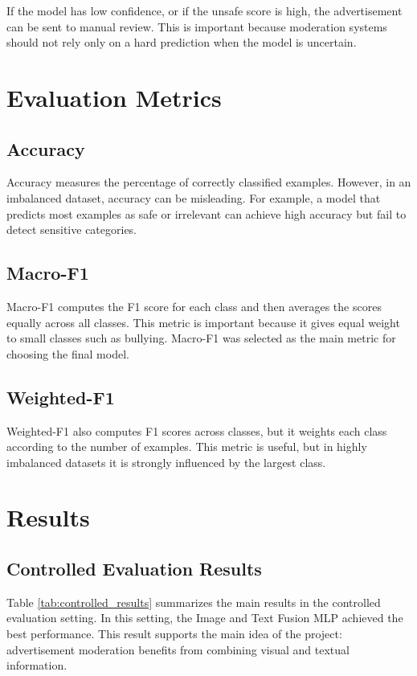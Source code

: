 \documentclass[12pt]{article}
\begin{document}
If the model has low confidence, or if the unsafe score is high, the advertisement can be sent to manual review. This is important because moderation systems should not rely only on a hard prediction when the model is uncertain.

\section{Evaluation Metrics}

\subsection{Accuracy}

Accuracy measures the percentage of correctly classified examples. However, in an imbalanced dataset, accuracy can be misleading. For example, a model that predicts most examples as safe or irrelevant can achieve high accuracy but fail to detect sensitive categories.

\subsection{Macro-F1}

Macro-F1 computes the F1 score for each class and then averages the scores equally across all classes. This metric is important because it gives equal weight to small classes such as bullying. Macro-F1 was selected as the main metric for choosing the final model.

\subsection{Weighted-F1}

Weighted-F1 also computes F1 scores across classes, but it weights each class according to the number of examples. This metric is useful, but in highly imbalanced datasets it is strongly influenced by the largest class.

\section{Results}

\subsection{Controlled Evaluation Results}

Table \ref{tab:controlled_results} summarizes the main results in the controlled evaluation setting. In this setting, the Image and Text Fusion MLP achieved the best performance. This result supports the main idea of the project: advertisement moderation benefits from combining visual and textual information.
\end{document}
